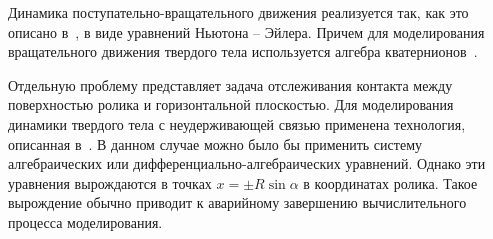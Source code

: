 

%

Динамика поступательно-вращательного движения реализуется так, как это описано
в~\cite{Kosenko2007}, в виде уравнений Ньютона -- Эйлера. Причем для 
моделирования вращательного движения твердого тела используется алгебра 
кватернионов~\cite{KosenkoQuaternionRus,Kosenko1998}.

Отдельную проблему представляет задача отслеживания контакта между поверхностью 
ролика и горизонтальной плоскостью. Для моделирования динамики твердого тела с
неудерживающей связью применена технология, описанная в~\cite{Kosenko2006}. В
данном случае можно было бы применить систему алгебраических или 
дифференциально-алгебраических уравнений. Однако эти уравнения вырождаются в 
точках $x=\pm R\sin\alpha $ в координатах ролика. Такое вырождение обычно 
приводит к аварийному завершению вычислительного процесса моделирования.

